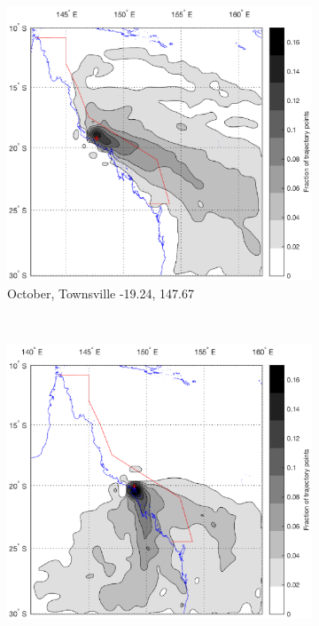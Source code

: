 	\begin{figure}[!hbt]
    \centering
    \begin{subfigure}[b]{0.45\textwidth}
	    \includegraphics[width=\textwidth]{Fig/Research/BT_Ship/Map_103.eps}
	    \caption{October, Townsville -19.24, 147.67}
	    \label{subfig:octtown}
    \end{subfigure}
    ~
    \begin{subfigure}[b]{0.45\textwidth}
    	\includegraphics[width=\textwidth]{Fig/Research/BT_Coast/Map_062.eps}

\end{subfigure}
\end{figure}
